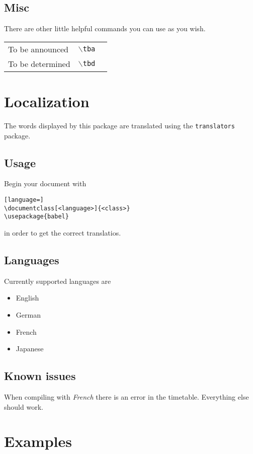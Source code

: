 \documentclass[english]{article}
\newcommand{\cmd}[1]{$\backslash$\texttt{{#1}}}
\begin{document}
	\subsection{Misc}
	\label{misc}
	There are other little helpful commands you can use as you wish.
	\begin{center}
		\begin{tabular}{lll}
			To be announced&\cmd{tba}&\tba\\
			To be determined&\cmd{tbd}&\tbd\\
		\end{tabular}
	\end{center}

	\pagebreak
	\section{Localization}
	The words displayed by this package are translated using the  \texttt{translators} package. 
	
	\subsection{Usage}
	Begin your document with
	\begin{lstlisting}[language=]
\documentclass[<language>]{<class>}
\usepackage{babel}
	\end{lstlisting}	
	in order to get the correct translatios.
	
	\subsection{Languages}
	Currently supported languages are
	\begin{itemize}
		\item 
		English
		
		\item
		German
		
		\item
		French
		
		\item
		Japanese
	\end{itemize}

	\subsection{Known issues}
	When compiling with \emph{French} there is an error in the timetable. Everything else should work.
	
	\pagebreak
	\section{Examples}
\end{document}
